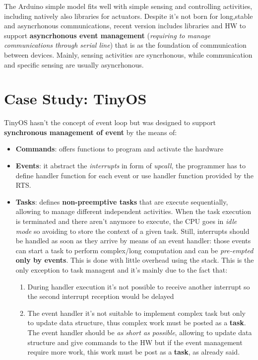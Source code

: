 \documentclass[10pt,a4paper]{report}
\theoremstyle{definition}
\begin{document}
The Arduino simple model fits well with simple sensing and controlling activities, including natively also libraries for actuators. Despite it's not born for long,stable and asyncrhonous communications, recent version includes libraries and HW to support \textbf{asyncrhonous event management} (\textit{requiring to manage communications through serial line}) that is as the foundation of communication between devices. Mainly, sensing activities are syncrhonous, while communication and specific sensing are usually asyncrhonous.
\section{Case Study: TinyOS}\label{sec:case-study-tinyos}
TinyOS hasn't the concept of event loop but was designed to support \textbf{synchronous management of event} by the means of:
\begin{itemize}
	\item 
	\textbf{Commands}: offers functions to program and activate the hardware
	\item 
	\textbf{Events}: it abstract the \textit{interrupts} in form of \textit{upcall}, the programmer has to define handler function for each event or use handler function provided by the RTS.
	\item 
	\textbf{Tasks}: defines \textbf{non-preemptive tasks} that are execute sequentially, allowing to manage different independent activities.  When the task execution is terminated and there aren't anymore to execute, the CPU goes in \textit{idle mode} so avoiding to store the context of a given task.
	Still, interrupts should be handled as soon as they arrive by means of an event handler: those events can start a task to perform complex/long computation and can be \textit{pre-empted} \textbf{only by events}.  This is done with little overhead using the stack. This is the only exception to task managent and it's mainly due to the fact that:
	\begin{enumerate}
		\item 
		During handler execution it's not possible to receive another interrupt so the second interrupt reception would be delayed
		\item 
		The event handler it's not suitable to implement complex task but only to update data structure, thus complex work must be posted as a \textbf{task}.
		The event handler should be \textit{as short as possible}, allowing to update data structure and give commands to the HW but if the event management require more work, this work must be post as a \textbf{task}, as already said.
	\end{enumerate}
\end{itemize}
\end{document}
